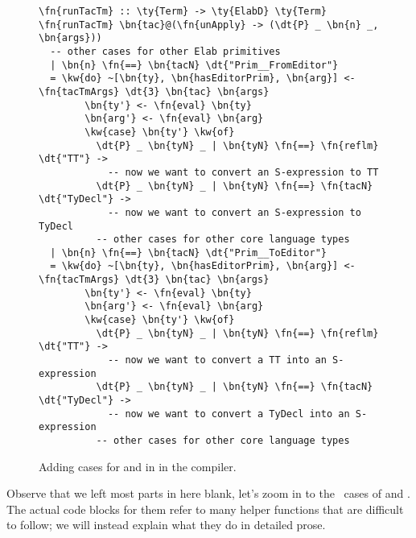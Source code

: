 \begin{figure}[ht]
\caption{Adding cases for  and  in  in the compiler.}
\label{code:runElabAction}
\begin{Verbatim}[framesep=2mm, label=\footnotesize{\normalfont{Haskell}}, labelposition=topline]
\fn{runTacTm} :: \ty{Term} -> \ty{ElabD} \ty{Term}
\fn{runTacTm} \bn{tac}@(\fn{unApply} -> (\dt{P} _ \bn{n} _, \bn{args}))
  -- other cases for other Elab primitives
  | \bn{n} \fn{==} \bn{tacN} \dt{"Prim__FromEditor"}
  = \kw{do} ~[\bn{ty}, \bn{hasEditorPrim}, \bn{arg}] <- \fn{tacTmArgs} \dt{3} \bn{tac} \bn{args}
        \bn{ty'} <- \fn{eval} \bn{ty}
        \bn{arg'} <- \fn{eval} \bn{arg}
        \kw{case} \bn{ty'} \kw{of}
          \dt{P} _ \bn{tyN} _ | \bn{tyN} \fn{==} \fn{reflm} \dt{"TT"} ->
            -- now we want to convert an S-expression to TT
          \dt{P} _ \bn{tyN} _ | \bn{tyN} \fn{==} \fn{tacN} \dt{"TyDecl"} ->
            -- now we want to convert an S-expression to TyDecl
          -- other cases for other core language types
  | \bn{n} \fn{==} \bn{tacN} \dt{"Prim__ToEditor"}
  = \kw{do} ~[\bn{ty}, \bn{hasEditorPrim}, \bn{arg}] <- \fn{tacTmArgs} \dt{3} \bn{tac} \bn{args}
        \bn{ty'} <- \fn{eval} \bn{ty}
        \bn{arg'} <- \fn{eval} \bn{arg}
        \kw{case} \bn{ty'} \kw{of}
          \dt{P} _ \bn{tyN} _ | \bn{tyN} \fn{==} \fn{reflm} \dt{"TT"} ->
            -- now we want to convert a TT into an S-expression
          \dt{P} _ \bn{tyN} _ | \bn{tyN} \fn{==} \fn{tacN} \dt{"TyDecl"} ->
            -- now we want to convert a TyDecl into an S-expression
          -- other cases for other core language types
\end{Verbatim}
\end{figure}

Observe that we left most parts in here blank, let's zoom in to the \TT\ cases
  of  and . The actual code blocks
  for them refer to many helper functions that are difficult to follow; we will
  instead explain what they do in detailed prose.

